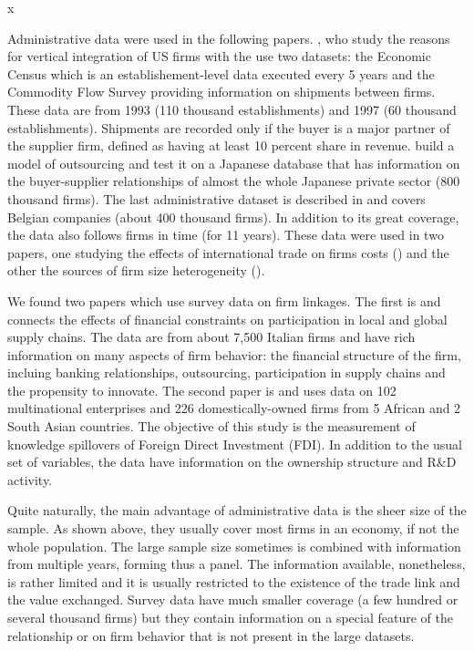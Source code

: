 x\documentclass[final, dvipsnames, authoryear,12pt]{elsarticle}
\begin{document}
Administrative data were used in the following papers. \cite{atalay2014vertical}, who study the reasons for vertical integration of US firms with the use two datasets: the Economic Census which is an establishement-level data executed every 5 years and the Commodity Flow Survey providing information on shipments between firms. These data are from 1993 (110 thousand establishments) and 1997 (60 thousand establishments). Shipments are recorded only if the buyer is a major partner of the supplier firm, defined as having at least 10 percent share in revenue.  \cite{bernard2019production} build a model of outsourcing and test it on a Japanese database that has information on the buyer-supplier relationships of almost the whole Japanese private sector (800 thousand firms). The last administrative dataset is described in \cite{dhyne2015belgian} and covers Belgian companies (about 400 thousand firms). In addition to its great coverage, the data also follows firms in time (for 11 years). These data were used in two papers, one studying the effects of international trade on firms costs (\cite{tintelnot2018trade}) and the other the sources of firm size heterogeneity (\cite{bernard2019production}).

We found two papers which use survey data on firm linkages. The first is \cite{minetti2018financial} and connects the effects of financial constraints on participation in local and global supply chains. The data are from about 7,500 Italian firms and have rich information on many aspects of firm behavior: the financial structure of the firm, incluing banking relationships, outsourcing, participation in supply chains and the propensity to innovate. The second paper is \cite{newman2018linked} and uses data on 102 multinational enterprises and 226 domestically-owned firms from 5 African and 2 South Asian countries. The objective of this study is the measurement of knowledge spillovers of Foreign Direct Investment (FDI). In addition to the usual set of variables, the data have information on the ownership structure and R&D activity.

Quite naturally, the main advantage of administrative data is the sheer size of the sample. As shown above, they usually cover most firms in an economy, if not the whole population. The large sample size sometimes is combined with information from multiple years, forming thus a panel. The information available, nonetheless, is rather limited and it is usually restricted to the existence of the trade link and the value exchanged. Survey data have much smaller coverage (a few hundred or several thousand firms) but they contain information on a special feature of the relationship or on firm behavior that is not present in the large datasets.
\end{document}

